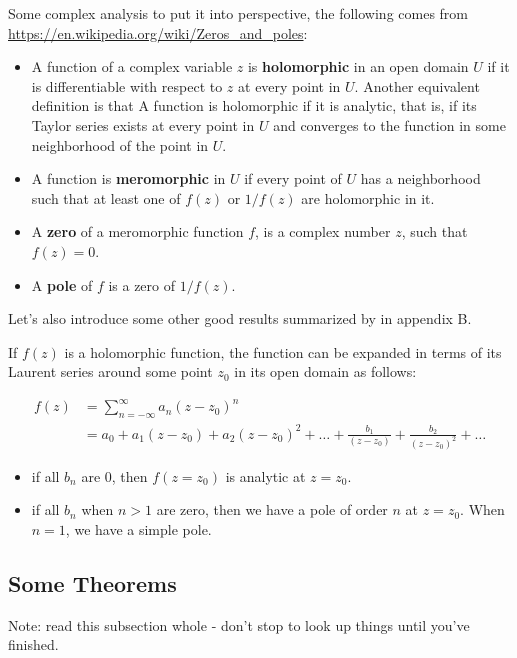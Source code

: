 Some complex analysis to put it into perspective, the following comes from
\url{https://en.wikipedia.org/wiki/Zeros_and_poles}:
\begin{itemize}
\item A function of a complex variable $z$ is \textbf{holomorphic} in an open domain $U$ if it is
    differentiable with respect to $z$ at every point in $U$. Another equivalent definition is that A
    function is holomorphic if it is analytic, that is, if its Taylor series exists at every point in $U$
    and converges to the function in some neighborhood of the point in $U$.
\item A function is \textbf{meromorphic} in $U$ if every point of $U$ has a neighborhood such that at least
    one of $f(z)$ or $1/f(z)$ are holomorphic in it.
\item A \textbf{zero} of a meromorphic function $f$, is a complex number $z$, such that $f(z)=0$.
\item A \textbf{pole} of $f$ is a zero of $1/f(z)$.
\end{itemize}

Let's also introduce some other good results summarized by \cite{gifted-qft} in appendix B.

If $f(z)$ is a holomorphic function, the function can be expanded in terms of its Laurent series around
some point $z_0$ in its open domain as follows:

\begin{align*}
f(z) &= \sum_{n=-\infty}^{\infty} a_n \left(z - z_0\right)^n \\
&= a_0 + a_1 \left(z-z_0\right) + a_2 \left(z-z_0\right)^2 + \dots +
    \frac{b_1}{\left(z-z_0\right)} + \frac{b_2}{\left(z-z_0\right)^2} + \dots
\end{align*}

\begin{itemize}
\item if all $b_n$ are 0, then $f(z=z_0)$ is analytic at $z=z_0$.
\item if all $b_n$ when $n>1$ are zero, then we have a pole of order $n$ at $z=z_0$. When $n=1$,
    we have a simple pole.
\end{itemize}


\subsection{Some Theorems}

Note: read this subsection whole - don't stop to look up things until you've finished.
\\

